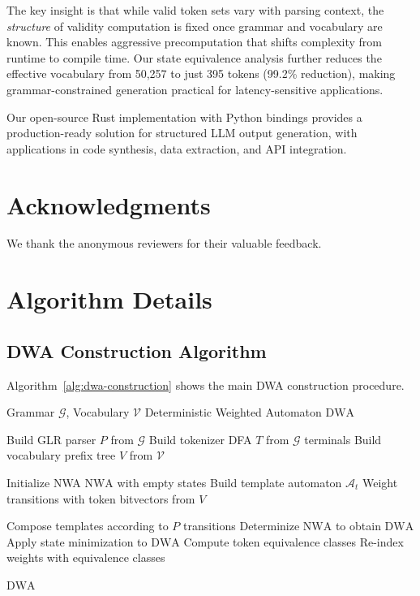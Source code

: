 \documentclass[11pt,a4paper]{article}
\newcommand{\vocab}{\mathcal{V}}
\newcommand{\grammar}{\mathcal{G}}
\newcommand{\automaton}{\mathcal{A}}
\newcommand{\dwa}{\text{DWA}}
\newcommand{\nwa}{\text{NWA}}
\theoremstyle{plain}
\theoremstyle{definition}
\theoremstyle{remark}
\begin{document}
The key insight is that while valid token sets vary with parsing context, the \emph{structure} of validity computation is fixed once grammar and vocabulary are known. This enables aggressive precomputation that shifts complexity from runtime to compile time. Our state equivalence analysis further reduces the effective vocabulary from 50,257 to just 395 tokens (99.2\% reduction), making grammar-constrained generation practical for latency-sensitive applications.

Our open-source Rust implementation with Python bindings provides a production-ready solution for structured LLM output generation, with applications in code synthesis, data extraction, and API integration.

\section*{Acknowledgments}

We thank the anonymous reviewers for their valuable feedback.




\appendix

\section{Algorithm Details}
\label{app:algorithms}

\subsection{DWA Construction Algorithm}

Algorithm~\ref{alg:dwa-construction} shows the main DWA construction procedure.

\begin{algorithm}[h]
\caption{DWA Construction}
\label{alg:dwa-construction}
\begin{algorithmic}[1]
\Require Grammar $\grammar$, Vocabulary $\vocab$
\Ensure Deterministic Weighted Automaton $\dwa$

\State Build GLR parser $P$ from $\grammar$
\State Build tokenizer DFA $T$ from $\grammar$ terminals
\State Build vocabulary prefix tree $V$ from $\vocab$

\State Initialize NWA $\nwa$ with empty states
\For{each terminal $t$ in $\grammar$}
    \State Build template automaton $\automaton_t$
    \State Weight transitions with token bitvectors from $V$
\EndFor

\State Compose templates according to $P$ transitions
\State Determinize $\nwa$ to obtain $\dwa$
\State Apply state minimization to $\dwa$
\State Compute token equivalence classes
\State Re-index weights with equivalence classes

\Return $\dwa$
\end{algorithmic}
\end{algorithm}
\end{document}
